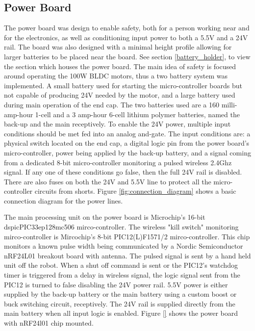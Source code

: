 \subsection{Power Board}
\label{power_board}
The power board was design to enable safety, both for a person working near \SB{} and for the electronics, as well as conditioning input power to both a 5.5V and a 24V rail.
The board was also designed with a minimal height profile allowing for larger batteries to be placed near the board.
See section \ref{battery_holder}, to view the section which houses the power board.
The main idea of safety is focused around operating the 100W BLDC motors, thus a two battery system was implemented.
A small battery used for starting the micro-controller boards but not capable of producing 24V needed by the motor, and a large battery used during main operation of the end cap.
The two batteries used are a 160 milli-amp-hour 1-cell and a 3 amp-hour 6-cell lithium polymer batteries, named the back-up and the main receptively.
To enable the 24V power, multiple input conditions should be met fed into an analog and-gate.
The input conditions are: a physical switch located on the end cap, a digital logic pin from the power board's micro-controller, power being applied by the back-up battery, and a signal coming from a dedicated 8-bit micro-controller monitoring a pulsed wireless 2.4Ghz signal.
If any one of these conditions go false, then the full 24V rail is disabled.
There are also fuses on both the 24V and 5.5V line to protect all the micro-controller circuits from shorts.
Figure \ref{fig:connection_diagram} shows a basic connection diagram for the power lines.

The main processing unit on the power board is Microchip's 16-bit dspicPIC33ep128mc506 mirco-controller.
The wireless "kill switch" monitoring mirco-controller is Mircochip's 8-bit PIC12(L)F1571/2 mirco-controller.
This chip monitors a known pulse width being communicated by a Nordic Semiconductor nRF24L01 breakout board with antenna.
The pulsed signal is sent by a hand held unit off the robot.
When a shut off command is sent or the PIC12's watchdog timer is triggered from a delay in wireless signal, the logic signal sent from the PIC12 is turned to false disabling the 24V power rail. 
5.5V power is either supplied by the back-up battery or the main battery using a custom boost or buck switching circuit, receptively.
The 24V rail is supplied directly from the main battery when all input logic is enabled.
Figure \ref{} shows the power board with nRF24l01 chip mounted. 

